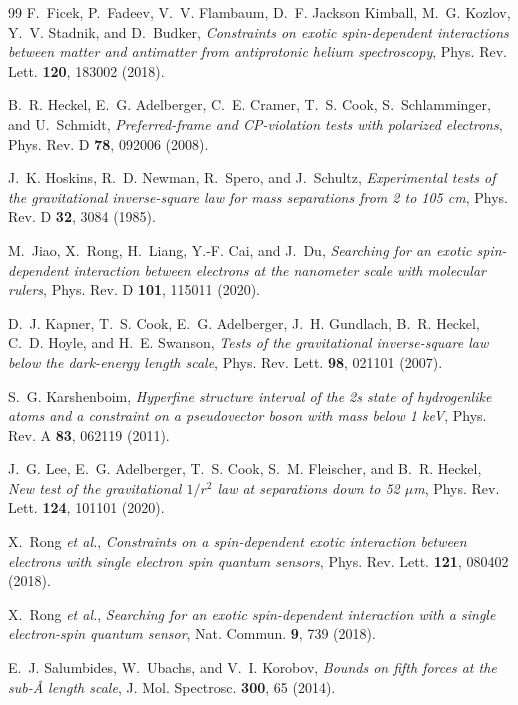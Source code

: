 \documentclass[
  aps,
  prd,
  reprint,
  amsmath,
  amssymb,
  nofootinbib,
  superscriptaddress,
  floatfix
]{revtex4-2}
\begin{document}
\begin{thebibliography}{99}
F.~Ficek, P.~Fadeev, V.~V. Flambaum, D.~F. Jackson Kimball, M.~G. Kozlov,
Y.~V. Stadnik, and D.~Budker,
\textit{Constraints on exotic spin-dependent interactions between matter
and antimatter from antiprotonic helium spectroscopy},
Phys. Rev. Lett. \textbf{120}, 183002 (2018).

B.~R. Heckel, E.~G. Adelberger, C.~E. Cramer, T.~S. Cook,
S.~Schlamminger, and U.~Schmidt,
\textit{Preferred-frame and CP-violation tests with polarized electrons},
Phys. Rev. D \textbf{78}, 092006 (2008).

J.~K. Hoskins, R.~D. Newman, R.~Spero, and J.~Schultz,
\textit{Experimental tests of the gravitational inverse-square law for
mass separations from 2 to 105 cm},
Phys. Rev. D \textbf{32}, 3084 (1985).

M.~Jiao, X.~Rong, H.~Liang, Y.-F. Cai, and J.~Du,
\textit{Searching for an exotic spin-dependent interaction between
electrons at the nanometer scale with molecular rulers},
Phys. Rev. D \textbf{101}, 115011 (2020).

D.~J. Kapner, T.~S. Cook, E.~G. Adelberger, J.~H. Gundlach,
B.~R. Heckel, C.~D. Hoyle, and H.~E. Swanson,
\textit{Tests of the gravitational inverse-square law below the
dark-energy length scale},
Phys. Rev. Lett. \textbf{98}, 021101 (2007).

S.~G. Karshenboim,
\textit{Hyperfine structure interval of the 2s state of hydrogenlike
atoms and a constraint on a pseudovector boson with mass below 1 keV},
Phys. Rev. A \textbf{83}, 062119 (2011).

J.~G. Lee, E.~G. Adelberger, T.~S. Cook, S.~M. Fleischer, and
B.~R. Heckel,
\textit{New test of the gravitational $1/r^2$ law at separations down to
52 $\mu$m},
Phys. Rev. Lett. \textbf{124}, 101101 (2020).

X.~Rong \textit{et al.},
\textit{Constraints on a spin-dependent exotic interaction between
electrons with single electron spin quantum sensors},
Phys. Rev. Lett. \textbf{121}, 080402 (2018).

X.~Rong \textit{et al.},
\textit{Searching for an exotic spin-dependent interaction with a single
electron-spin quantum sensor},
Nat. Commun. \textbf{9}, 739 (2018).

E.~J. Salumbides, W.~Ubachs, and V.~I. Korobov,
\textit{Bounds on fifth forces at the sub-\AA{} length scale},
J. Mol. Spectrosc. \textbf{300}, 65 (2014).


\end{thebibliography}
\end{document}
